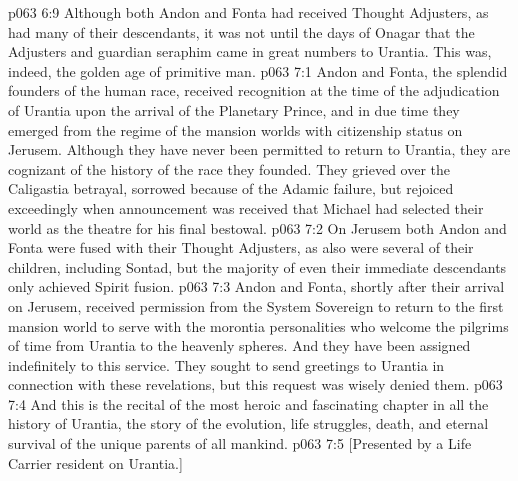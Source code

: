 \vs p063 6:9 Although both Andon and Fonta had received Thought Adjusters, as had many of their descendants, it was not until the days of Onagar that the Adjusters and guardian seraphim came in great numbers to Urantia. This was, indeed, the golden age of primitive man.
\vs p063 7:1 Andon and Fonta, the splendid founders of the human race, received recognition at the time of the adjudication of Urantia upon the arrival of the Planetary Prince, and in due time they emerged from the regime of the mansion worlds with citizenship status on Jerusem. Although they have never been permitted to return to Urantia, they are cognizant of the history of the race they founded. They grieved over the Caligastia betrayal, sorrowed because of the Adamic failure, but rejoiced exceedingly when announcement was received that Michael had selected their world as the theatre for his final bestowal.
\vs p063 7:2 On Jerusem both Andon and Fonta were fused with their Thought Adjusters, as also were several of their children, including Sontad, but the majority of even their immediate descendants only achieved Spirit fusion.
\vs p063 7:3 Andon and Fonta, shortly after their arrival on Jerusem, received permission from the System Sovereign to return to the first mansion world to serve with the morontia personalities who welcome the pilgrims of time from Urantia to the heavenly spheres. And they have been assigned indefinitely to this service. They sought to send greetings to Urantia in connection with these revelations, but this request was wisely denied them.
\vs p063 7:4 \pc And this is the recital of the most heroic and fascinating chapter in all the history of Urantia, the story of the evolution, life struggles, death, and eternal survival of the unique parents of all mankind.
\vsetoff
\vs p063 7:5 [Presented by a Life Carrier resident on Urantia.]
\quizlink
